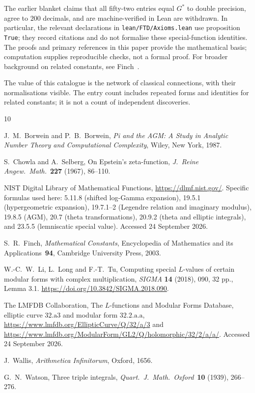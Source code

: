 \documentclass[12pt,reqno]{amsart}
\theoremstyle{definition}
\theoremstyle{remark}
\newcommand{\Gstar}{G^{\!*}}
\begin{document}
The earlier blanket claims that all fifty-two entries equal $\Gstar$
to double precision, agree to $200$ decimals, and are machine-verified
in Lean are withdrawn. In particular, the relevant declarations in
\texttt{lean/FTD/Axioms.lean} use proposition \texttt{True}; they record
citations and do not formalise these special-function identities.
The proofs and primary references in this paper provide the mathematical
basis; computation supplies reproducible checks, not a formal proof.
For broader background on related constants, see Finch~\cite{Finch}.

\medskip

The value of this catalogue is the network of classical connections,
with their normalisations visible. The entry count includes repeated
forms and identities for related constants; it is not a count of
independent discoveries.



\begin{thebibliography}{10}

J.~M.~Borwein and P.~B.~Borwein,
\emph{Pi and the AGM: A Study in Analytic Number Theory and Computational
Complexity}, Wiley, New York, 1987.

S.~Chowla and A.~Selberg,
On Epstein's zeta-function,
\emph{J.~Reine Angew.\ Math.}\ \textbf{227} (1967), 86--110.

NIST Digital Library of Mathematical Functions,
\url{https://dlmf.nist.gov/}. Specific formulas used here:
5.11.8 (shifted log-Gamma expansion), 19.5.1 (hypergeometric expansion),
19.7.1--2 (Legendre relation and imaginary modulus), 19.8.5 (AGM),
20.7 (theta transformations), 20.9.2 (theta and elliptic integrals),
and 23.5.5 (lemniscatic special value). Accessed 24 September 2026.

S.~R.~Finch,
\emph{Mathematical Constants},
Encyclopedia of Mathematics and its Applications~\textbf{94},
Cambridge University Press, 2003.

W.-C.~W.~Li, L.~Long and F.-T.~Tu,
Computing special $L$-values of certain modular forms with complex
multiplication, \emph{SIGMA} \textbf{14} (2018), 090, 32 pp.,
Lemma 3.1. \url{https://doi.org/10.3842/SIGMA.2018.090}.

The LMFDB Collaboration, The $L$-functions and Modular Forms Database,
elliptic curve $32.\mathrm{a}3$ and modular form $32.2.\mathrm{a.a}$,
\url{https://www.lmfdb.org/EllipticCurve/Q/32/a/3} and
\url{https://www.lmfdb.org/ModularForm/GL2/Q/holomorphic/32/2/a/a/}.
Accessed 24 September 2026.

J.~Wallis,
\emph{Arithmetica Infinitorum}, Oxford, 1656.

G.~N.~Watson,
Three triple integrals,
\emph{Quart.\ J.\ Math.\ Oxford}\ \textbf{10} (1939), 266--276.

\end{thebibliography}
\end{document}
